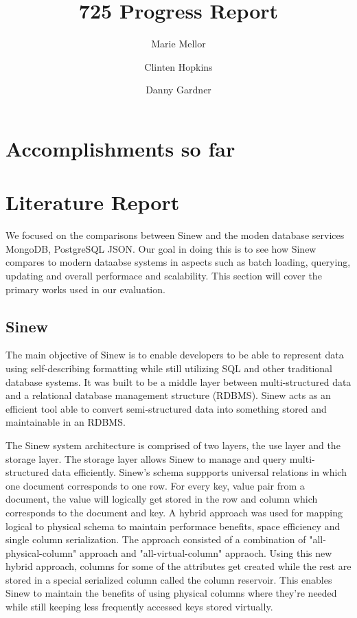\documentclass[sigconf]{acmart}
\begin{document}
\title{725 Progress Report}
\author{Marie Mellor \and Clinten Hopkins \and Danny Gardner}

\maketitle

\section{Accomplishments so far}

\section{Literature Report}
    We focused on the comparisons between Sinew and the moden database services MongoDB, PostgreSQL JSON. Our goal in doing this is to see how Sinew compares to modern dataabse systems in aspects such as batch loading, querying, updating and overall performace and scalability. This section will cover the primary works used in our evaluation. 

    \subsection{Sinew}

    The main objective of Sinew\cite{Tahara_Diamond_Abadi_2014} is to enable developers to be able to represent data using self-describing formatting while still utilizing SQL and other traditional database systems. It was built to be a middle layer between multi-structured data and a relational database management structure (RDBMS). Sinew acts as an efficient tool able to convert semi-structured data into something stored and maintainable in an RDBMS. 

    The Sinew system architecture is comprised of two layers, the use layer and the storage layer. The storage layer allows Sinew to manage and query multi-structured data efficiently. Sinew's schema suppports universal relations in which one document corresponds to one row. For every key, value pair from a document, the value will logically get stored in the row and column which corresponds to the document and key. A hybrid approach was used for mapping logical to physical schema to maintain performace benefits, space efficiency and single column serialization. The approach consisted of a combination of "all-physical-column" approach and "all-virtual-column" appraoch. Using this new hybrid approach, columns for some of the attributes get created while the rest are stored in a special serialized column called the column reservoir. This enables Sinew to maintain the benefits of using physical columns where they're needed while still keeping less frequently accessed keys stored virtually. 
\end{document}
